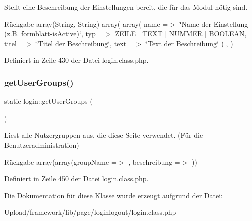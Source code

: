 Stellt eine Beschreibung der Einstellungen bereit, die für das Modul nötig sind. \begin{DoxyReturn}{Rückgabe}
array(\+String, String) array( array( \textquotesingle{}name\textquotesingle{} =$>$ \char`\"{}\+Name der Einstellung (z.\+B. formblatt-\/is\+Active)\char`\"{}, \textquotesingle{}typ\textquotesingle{} =$>$ Z\+E\+I\+LE $\vert$ T\+E\+XT $\vert$ N\+U\+M\+M\+ER $\vert$ B\+O\+O\+L\+E\+AN, \textquotesingle{}titel\textquotesingle{} =$>$ \char`\"{}\+Titel der Beschreibung\char`\"{}, \textquotesingle{}text\textquotesingle{} =$>$ \char`\"{}\+Text der Beschreibung\char`\"{} ) , ) 
\end{DoxyReturn}


Definiert in Zeile 430 der Datei login.\+class.\+php.

\mbox{\label{classlogin_a7a98ec5a1152b564785795dcf0c8c214}} 
\subsubsection{\texorpdfstring{get\+User\+Groups()}{getUserGroups()}}
{\footnotesize\ttfamily static login\+::get\+User\+Groups (\begin{DoxyParamCaption}{ }\end{DoxyParamCaption})\hspace{0.3cm}{\ttfamily [static]}}

Liest alle Nutzergruppen aus, die diese Seite verwendet. (Für die Benutzeradministration) \begin{DoxyReturn}{Rückgabe}
array(array(\textquotesingle{}group\+Name\textquotesingle{} =$>$ \textquotesingle{}\textquotesingle{}, \textquotesingle{}beschreibung\textquotesingle{} =$>$ \textquotesingle{}\textquotesingle{})) 
\end{DoxyReturn}


Definiert in Zeile 450 der Datei login.\+class.\+php.



Die Dokumentation für diese Klasse wurde erzeugt aufgrund der Datei\+:\begin{DoxyCompactItemize}
\item 
Upload/framework/lib/page/loginlogout/login.\+class.\+php\end{DoxyCompactItemize}
